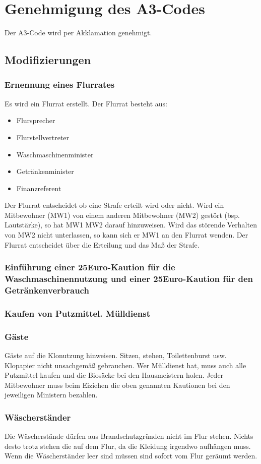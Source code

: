\documentclass[10pt,a4paper,final]{article}
\begin{document}
\section{Genehmigung des A3-Codes}
Der A3-Code wird per Akklamation genehmigt.
\subsection{Modifizierungen}
\subsubsection{Ernennung eines Flurrates}
Es wird ein Flurrat erstellt. Der Flurrat besteht aus:
\begin{itemize}
	\item Flursprecher
	\item Flurstellvertreter
	\item Waschmaschinenminister
	\item Getränkenminister
	\item Finanzreferent
\end{itemize}
Der Flurrat entscheidet ob eine Strafe erteilt wird oder nicht. Wird ein Mitbewohner (MW1) von einem anderen Mitbewohner (MW2) gestört (bsp. Lautstärke), so hat MW1 MW2 darauf hinzuweisen. Wird das störende Verhalten von MW2 nicht unterlassen, so kann sich er MW1 an den Flurrat wenden. Der Flurrat entscheidet über die Erteilung und das Maß der Strafe.
\subsubsection{Einführung einer 25Euro-Kaution für die Waschmaschinennutzung und einer 25Euro-Kaution für den Getränkenverbrauch}
\subsubsection{Kaufen von Putzmittel. Mülldienst}
\subsubsection{Gäste}
Gäste auf die Klonutzung hinweisen. Sitzen, stehen, Toilettenburst usw. Klopapier nicht unsachgemäß gebrauchen.
Wer Mülldienst hat, muss auch alle Putzmittel kaufen und die Biosäcke bei den Hausmeistern holen.
Jeder Mitbewohner muss beim Eiziehen die oben genannten Kautionen bei den jeweiligen Ministern bezahlen.
\subsubsection{Wäscherständer}
Die Wäscherstände dürfen aus Brandschutzgründen nicht im Flur stehen. Nichts desto trotz stehen die auf dem Flur, da die Kleidung irgendwo aufhängen muss. Wenn die Wäscherständer leer sind müssen sind sofort vom Flur geräumt werden.
\end{document}
